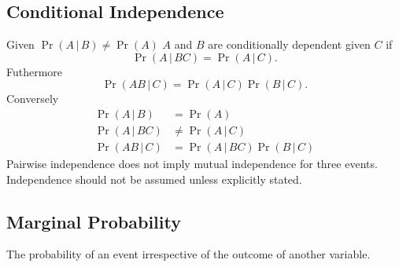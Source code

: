 \documentclass{article}
\begin{document}
\begin{multicols}{3}
    \subsection{Conditional Independence}
    Given \(\Pr{\left( A \,\vert\, B \right)} \neq \Pr{\left( A \right)}\)
    \(A\) and \(B\) are conditionally dependent given \(C\) if
    \begin{equation*}
        \Pr{\left( A \,\vert\, BC \right)} = \Pr{\left( A \,\vert\, C \right)}.
    \end{equation*}
    Futhermore
    \begin{equation*}
        \Pr{\left( AB \,\vert\, C \right)} = \Pr{\left( A \,\vert\, C \right)} \Pr{\left( B \,\vert\, C \right)}.
    \end{equation*}
    Conversely
    \begin{align*}
        \Pr{\left( A \,\vert\, B \right)}  & = \Pr{\left( A \right)}                                                \\
        \Pr{\left( A \,\vert\, BC \right)} & \neq \Pr{\left( A \,\vert\, C \right)}                                 \\
        \Pr{\left( AB \,\vert\, C \right)} & = \Pr{\left( A \,\vert\, BC \right)} \Pr{\left( B \,\vert\, C \right)}
    \end{align*}
    Pairwise independence does not imply mutual independence for three events.
    Independence should not be assumed unless explicitly stated.
    \subsection{Marginal Probability}
    The probability of an event irrespective of the outcome of another variable.

\end{multicols}
\end{document}
